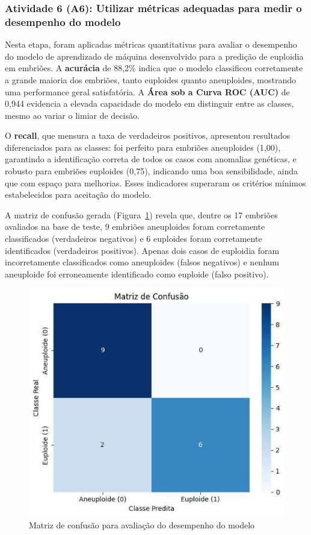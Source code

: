 \subsubsection{Atividade 6 (A6): Utilizar métricas adequadas para medir o desempenho do modelo}
Nesta etapa, foram aplicadas métricas quantitativas para avaliar o desempenho do modelo de aprendizado de máquina desenvolvido para a predição de euploidia em embriões. A \textbf{acurácia} de 88,2\% indica que o modelo classificou corretamente a grande maioria dos embriões, tanto euploides quanto aneuploides, mostrando uma performance geral satisfatória. A \textbf{Área sob a Curva ROC (AUC)} de 0,944 evidencia a elevada capacidade do modelo em distinguir entre as classes, mesmo ao variar o limiar de decisão. 

O \textbf{recall}, que mensura a taxa de verdadeiros positivos, apresentou resultados diferenciados para as classes: foi perfeito para embriões aneuploides (1,00), garantindo a identificação correta de todos os casos com anomalias genéticas, e robusto para embriões euploides (0,75), indicando uma boa sensibilidade, ainda que com espaço para melhorias. Esses indicadores superaram os critérios mínimos estabelecidos para aceitação do modelo.

A matriz de confusão gerada (Figura~\ref{fig:matrizDeConfusao}) revela que, dentre os 17 embriões avaliados na base de teste, 9 embriões aneuploides foram corretamente classificados (verdadeiros negativos) e 6 euploides foram corretamente identificados (verdadeiros positivos). Apenas dois casos de euploidia foram incorretamente classificados como aneuploides (falsos negativos) e nenhum aneuploide foi erroneamente identificado como euploide (falso positivo).

\begin{figure}[h]
    \captionsetup{font=footnotesize, justification=centering, labelsep=period, position=above}
    \centering
    \includegraphics[scale=0.11]{figuras/IA/matrizDeConfusao.pdf}
    \caption{Matriz de confusão para avaliação do desempenho do modelo}
    \label{fig:matrizDeConfusao}
\end{figure}
\FloatBarrier

